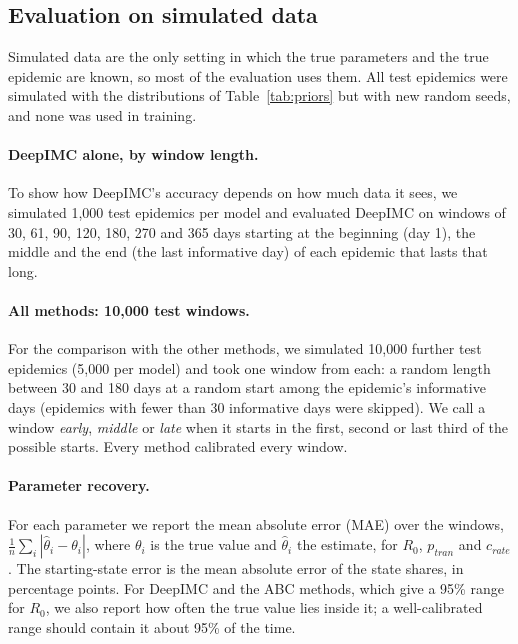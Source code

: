 \documentclass[12pt]{article}
\begin{document}
\subsection{Evaluation on simulated data}\label{sec:eval-sim}

Simulated data are the only setting in which the true parameters and the true epidemic are known, so
most of the evaluation uses them. All test epidemics were simulated with the distributions of
Table~\ref{tab:priors} but with new random seeds, and none was used in training.

\paragraph{DeepIMC alone, by window length.} To show how DeepIMC's accuracy depends on how much data it
sees, we simulated 1,000 test epidemics per model and evaluated DeepIMC on windows of 30, 61, 90, 120,
180, 270 and 365 days starting at the beginning (day 1), the middle and the end (the last informative
day) of each epidemic that lasts that long.

\paragraph{All methods: 10,000 test windows.} For the comparison with the other methods, we simulated
10,000 further test epidemics (5,000 per model) and took one window from each: a random length between
30 and 180 days at a random start among the epidemic's informative days (epidemics with fewer than 30
informative days were skipped). We call a window \emph{early}, \emph{middle} or \emph{late} when it
starts in the first, second or last third of the possible starts. Every method calibrated every window.

\paragraph{Parameter recovery.} For each parameter we report the mean absolute error (MAE) over the
windows, $\frac1n\sum_i|\hat\theta_i-\theta_i|$, where $\theta_i$ is the true value and $\hat\theta_i$
the estimate, for $R_0$, $p_{tran}$ and $c_{rate}$. The starting-state error is the mean absolute error
of the state shares, in percentage points. For DeepIMC and the ABC methods, which give a 95\% range for
$R_0$, we also report how often the true value lies inside it; a well-calibrated range should contain it
about 95\% of the time.
\end{document}
